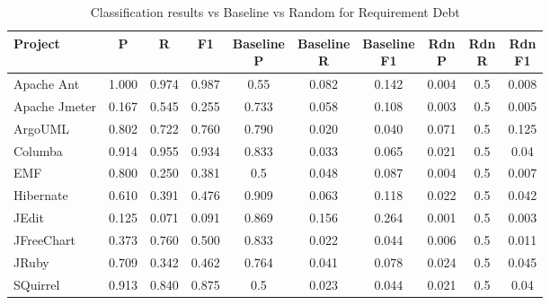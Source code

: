 \begin{table}[!hbt]
    \begin{center}
        \caption{Classification results vs Baseline vs Random for Requirement Debt}
        \label{tbl:classifier_results_vs_baseline_requirement}
        \begin{tabular}{l| c c c c c c c c c}
        \toprule
        \textbf{Project} & \textbf{P} & \textbf{R} & \textbf{F1} & \thead{Baseline\\P} & \thead{Baseline\\R} & \thead{Baseline\\F1} & \thead{Rdn\\P} & \thead{Rdn\\R} & \thead{Rdn\\F1} \\
        \midrule
        Apache Ant    & 1.000 &  0.974 &  0.987 & 0.55  & 0.082 & 0.142  & 0.004 &0.5 & 0.008  \\
        Apache Jmeter & 0.167 &  0.545 &  0.255 & 0.733 & 0.058 & 0.108  & 0.003 &0.5 & 0.005  \\
        ArgoUML       & 0.802 &  0.722 &  0.760 & 0.790 & 0.020 & 0.040  & 0.071 &0.5 & 0.125  \\
        Columba       & 0.914 &  0.955 &  0.934 & 0.833 & 0.033 & 0.065  & 0.021 &0.5 &  0.04  \\
        EMF           & 0.800 &  0.250 &  0.381 & 0.5   & 0.048 & 0.087  & 0.004 &0.5 & 0.007  \\
        Hibernate     & 0.610 &  0.391 &  0.476 & 0.909 & 0.063 & 0.118  & 0.022 &0.5 & 0.042  \\
        JEdit         & 0.125 &  0.071 &  0.091 & 0.869 & 0.156 & 0.264  & 0.001 &0.5 & 0.003  \\
        JFreeChart    & 0.373 &  0.760 &  0.500 & 0.833 & 0.022 & 0.044  & 0.006 &0.5 & 0.011  \\
        JRuby         & 0.709 &  0.342 &  0.462 & 0.764 & 0.041 & 0.078  & 0.024 &0.5 & 0.045  \\
        SQuirrel      & 0.913 &  0.840 &  0.875 & 0.5   & 0.023 & 0.044  & 0.021 &0.5 &  0.04  \\
        \bottomrule
        \end{tabular}
    \end{center}    
\end{table}

\clearpage

